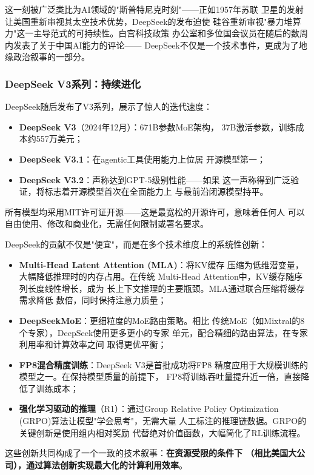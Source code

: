 这一刻被广泛类比为AI领域的"斯普特尼克时刻"——正如1957年苏联
卫星的发射让美国重新审视其太空技术优势，DeepSeek的发布迫使
硅谷重新审视"暴力堆算力"这一主导范式的可持续性。白宫科技政策
办公室和多位国会议员在随后的数周内发表了关于中国AI能力的评论——
DeepSeek不仅是一个技术事件，更成为了地缘政治叙事的一部分。

\subsubsection{DeepSeek V3系列：持续进化}
DeepSeek随后发布了V3系列，展示了惊人的迭代速度：
\begin{itemize}
  \item \textbf{DeepSeek V3}（2024年12月）：671B参数MoE架构，
    37B激活参数，训练成本约557万美元；
  \item \textbf{DeepSeek V3.1}：在agentic工具使用能力上位居
    开源模型第一；
  \item \textbf{DeepSeek V3.2}：声称达到GPT-5级别性能——如果
    这一声称得到广泛验证，将标志着开源模型首次在全面能力上
    与最前沿闭源模型持平。
\end{itemize}
所有模型均采用MIT许可证开源——这是最宽松的开源许可，意味着任何人
可以自由使用、修改和商业化，无需任何限制或署名要求。

\begin{keybox}[DeepSeek的核心技术创新]
DeepSeek的贡献不仅是"便宜"，而是在多个技术维度上的系统性创新：
\begin{itemize}
  \item \textbf{Multi-Head Latent Attention (MLA)}：将KV缓存
    压缩为低维潜变量，大幅降低推理时的内存占用。在传统
    Multi-Head Attention中，KV缓存随序列长度线性增长，成为
    长上下文推理的主要瓶颈。MLA通过联合压缩将缓存需求降低
    数倍，同时保持注意力质量；
  \item \textbf{DeepSeekMoE}：更细粒度的MoE路由策略。相比
    传统MoE（如Mixtral的8个专家），DeepSeek使用更多更小的专家
    单元，配合精细的路由算法，在专家利用率和计算效率之间
    取得更优平衡；
  \item \textbf{FP8混合精度训练}：DeepSeek V3是首批成功将FP8
    精度应用于大规模训练的模型之一。在保持模型质量的前提下，
    FP8将训练吞吐量提升近一倍，直接降低了训练成本；
  \item \textbf{强化学习驱动的推理}（R1）：通过Group Relative
    Policy Optimization (GRPO)算法让模型"学会思考"，无需大量
    人工标注的推理链数据。GRPO的关键创新是使用组内相对奖励
    代替绝对价值函数，大幅简化了RL训练流程。
\end{itemize}
这些创新共同构成了一个一致的技术叙事：\textbf{在资源受限的条件下
（相比美国大公司），通过算法创新实现最大化的计算利用效率}。
\end{keybox}

